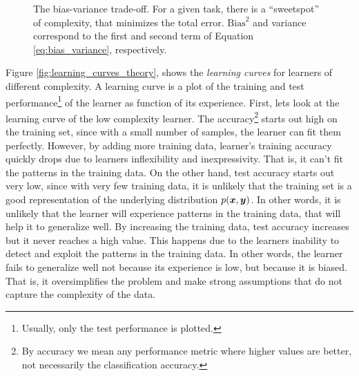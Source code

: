 \begin{figure}
	\centering
	\caption[The bias-variance trade-off.]{The bias-variance
	trade-off. For a given task,
	there is a ``sweetspot'' of complexity, that minimizes the total error.
	$\text{Bias}^2$ and variance correspond to the first and second term of
	Equation \ref{eq:bias_variance}, respectively.}
	\label{fig:bias_variance}
\end{figure}

Figure \ref{fig:learning_curves_theory}, shows the \emph{learning
curves} for learners of different complexity. A learning
curve is a plot of the training and test performance\footnote{Usually, only the test performance
is plotted.} of the learner as function of its experience.
First, lets look at the learning curve of the low complexity learner. The
accuracy\footnote{By accuracy we mean any performance metric where higher values are better, not necessarily the classification
accuracy.} starts out high on the training
set, since with a small number of samples, the learner can
fit them perfectly. However, by adding more training data, learner's training
accuracy quickly drops due to learners inflexibility
and inexpressivity. That is, it can't fit the patterns in the training data. On
the other hand, test accuracy starts out very low, since
with very few training data, it is unlikely that the training set is a good
representation of the underlying distribution $p(\boldsymbol{x},
\boldsymbol{y})$. In other words, it is unlikely that the learner will experience patterns
in the training data, that will help it to generalize well. By increasing the
training data, test accuracy increases but it never reaches a high value. This
happens due to the learners inability to detect and exploit the patterns in the
training data.  In other words, the learner fails to generalize well not because
its experience is low, but because it is biased. That is, it oversimplifies the
problem and make strong assumptions that do not capture the complexity of the
data.

